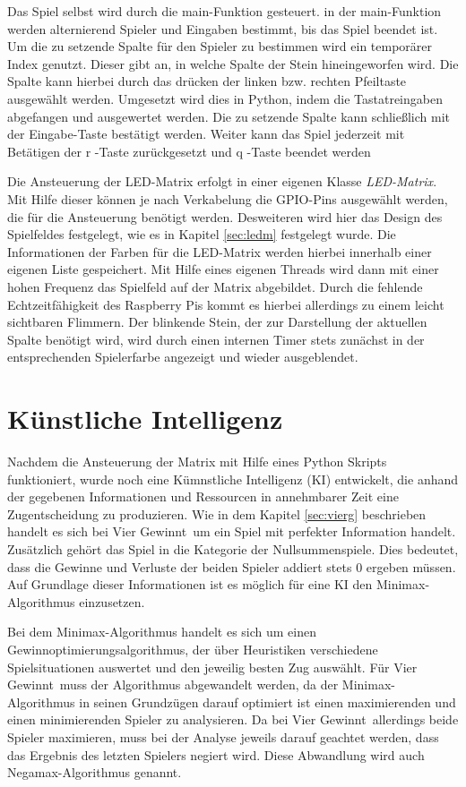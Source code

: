Das Spiel selbst wird durch die main-Funktion gesteuert. in der main-Funktion werden alternierend Spieler und Eingaben bestimmt, bis das Spiel beendet ist. Um die zu setzende Spalte für den Spieler zu bestimmen wird ein temporärer Index genutzt. Dieser gibt an, in welche Spalte der Stein hineingeworfen wird. Die Spalte kann hierbei durch das drücken der linken bzw. rechten Pfeiltaste ausgewählt werden. Umgesetzt wird dies in Python, indem die Tastatreingaben abgefangen und ausgewertet werden. Die zu setzende Spalte kann schließlich mit der Eingabe-Taste bestätigt werden. Weiter kann das Spiel jederzeit mit Betätigen der \glqq r \grqq -Taste zurückgesetzt und \glqq q \grqq -Taste beendet werden

Die Ansteuerung der LED-Matrix erfolgt in einer eigenen Klasse \textit{LED-Matrix}. Mit Hilfe dieser können je nach Verkabelung die GPIO-Pins ausgewählt werden, die für die Ansteuerung benötigt werden. Desweiteren wird hier das Design des Spielfeldes festgelegt, wie es in Kapitel \ref{sec:ledm} festgelegt wurde.
Die Informationen der Farben für die LED-Matrix werden hierbei innerhalb einer eigenen Liste gespeichert.
Mit Hilfe eines eigenen Threads wird dann mit einer hohen Frequenz das Spielfeld auf der Matrix abgebildet. Durch die fehlende Echtzeitfähigkeit des Raspberry Pis kommt es hierbei allerdings zu einem leicht sichtbaren Flimmern. 
Der blinkende Stein, der zur Darstellung der aktuellen Spalte benötigt wird, wird durch einen internen Timer stets zunächst in der entsprechenden Spielerfarbe angezeigt und wieder ausgeblendet.

\section{Künstliche Intelligenz}
Nachdem die Ansteuerung der Matrix mit Hilfe eines Python Skripts funktioniert, wurde noch eine Kümnstliche Intelligenz (KI) entwickelt, die anhand der gegebenen Informationen und Ressourcen in annehmbarer Zeit eine Zugentscheidung zu produzieren.
Wie in dem Kapitel \ref{sec:vierg} beschrieben handelt es sich bei \glqq Vier Gewinnt\grqq ~um ein Spiel mit perfekter Information handelt. Zusätzlich gehört das Spiel in die Kategorie der Nullsummenspiele. Dies bedeutet, dass die Gewinne und Verluste der beiden Spieler addiert stets 0 ergeben müssen.
Auf Grundlage dieser Informationen ist es möglich für eine KI den Minimax-Algorithmus einzusetzen.

Bei dem Minimax-Algorithmus handelt es sich um einen Gewinnoptimierungsalgorithmus, der über Heuristiken verschiedene Spielsituationen auswertet und den jeweilig besten Zug auswählt.
Für \glqq Vier Gewinnt\grqq ~muss der Algorithmus abgewandelt werden, da der Minimax-Algorithmus in seinen Grundzügen darauf optimiert ist einen maximierenden und einen minimierenden Spieler zu analysieren. Da bei \glqq Vier Gewinnt\grqq ~allerdings beide Spieler maximieren, muss bei der Analyse jeweils darauf geachtet werden, dass das Ergebnis des letzten Spielers negiert wird. Diese Abwandlung wird auch Negamax-Algorithmus genannt.

